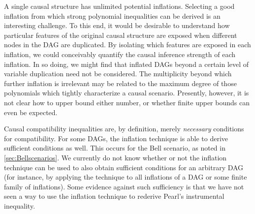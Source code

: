 {A single causal structure has unlimited potential inflations. Selecting a good inflation from which strong polynomial inequalities can be derived is an interesting challenge. To this end, it would be desirable to understand how particular features of the original causal structure are exposed when different nodes in the DAG are duplicated. By isolating which features are exposed in each inflation, we could conceivably quantify the causal inference strength of each inflation. In so doing, we might find that inflated DAGs beyond a certain level of variable duplication need not be considered. The multiplicity beyond which further inflation is irrelevant may be related to the maximum degree of those polynomials which tightly characterize a causal scenario. Presently, however, it is not clear how to upper bound either number, or whether finite upper bounds can even be expected.


Causal compatibility inequalities are, by definition, merely {\em necessary} conditions for compatibility.  For some DAGs, the inflation technique is able to derive sufficient conditions as well.  This occurs for the Bell scenario, as noted in \cref{sec:Bellscenarios}.  We currently do not know whether or not the inflation technique can be used to also obtain sufficient conditions for an arbitrary DAG (for instance, by applying the technique to all inflations of a DAG or some finite family of inflations).
Some evidence against such sufficiency is that we have not seen a way to use the inflation technique to rederive Pearl's instrumental inequality.


}
